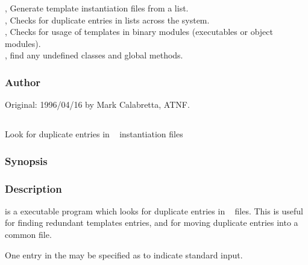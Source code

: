 , Generate template instantiation files from a list.\\
, Checks for duplicate entries in  lists
   across the system.\\
, Checks for usage of templates in binary modules (executables
or object modules).\\
, find any undefined classes and global methods.

\subsubsection*{Author}

Original: 1996/04/16 by Mark Calabretta, ATNF.


\newpage
\subsection{}
\label{duplicates}

Look for duplicate entries in \aipspp\  instantiation files

\subsubsection*{Synopsis}

\begin{synopsis}
\end{synopsis}

\subsubsection*{Description}

 is a  executable program which looks for duplicate
entries in \aipspp\  files. This is useful for finding
redundant templates entries, and for moving duplicate entries into a common
\code{templates} file.

One entry in the  may be specified as \code{-} to
indicate standard input.

